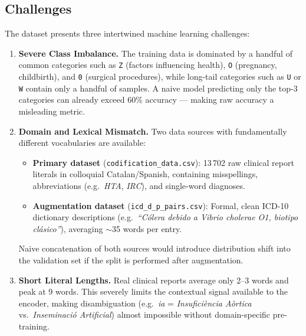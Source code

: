 \documentclass[10pt,a4paper,twocolumn]{article}
\begin{document}
\subsection{Challenges}

The dataset presents three intertwined machine learning challenges:

\begin{enumerate}
  \item \textbf{Severe Class Imbalance.} The training data is dominated by a
        handful of common categories such as \texttt{Z} (factors influencing
        health), \texttt{O} (pregnancy, childbirth), and \texttt{0} (surgical
        procedures), while long-tail categories such as \texttt{U} or \texttt{W}
        contain only a handful of samples. A naive model predicting only the
        top-3 categories can already exceed 60\% accuracy --- making raw accuracy a
        misleading metric.

  \item \textbf{Domain and Lexical Mismatch.} Two data sources with fundamentally
        different vocabularies are available:
        \begin{itemize}
          \item \textbf{Primary dataset} (\texttt{codification\_data.csv}):
                13\,702 raw clinical report literals in colloquial
                Catalan/Spanish, containing misspellings, abbreviations
                (e.g.\ \textit{HTA}, \textit{IRC}), and single-word diagnoses.
          \item \textbf{Augmentation dataset} (\texttt{icd\_d\_p\_pairs.csv}):
                Formal, clean ICD-10 dictionary descriptions (e.g.\ \textit{``C\'{o}lera
                debido a Vibrio cholerae O1, biotipo cl\'{a}sico''}), averaging
                $\sim$35 words per entry.
        \end{itemize}
        Naive concatenation of both sources would introduce distribution shift
        into the validation set if the split is performed after augmentation.

  \item \textbf{Short Literal Lengths.} Real clinical reports average only 2--3
        words and peak at 9 words. This severely limits the contextual signal
        available to the encoder, making disambiguation (e.g.\ \textit{ia}
        = \textit{Insufici\`encia A\`ortica} vs.\ \textit{Inseminaci\'{o}
        Artificial}) almost impossible without domain-specific pre-training.
\end{enumerate}
\end{document}
